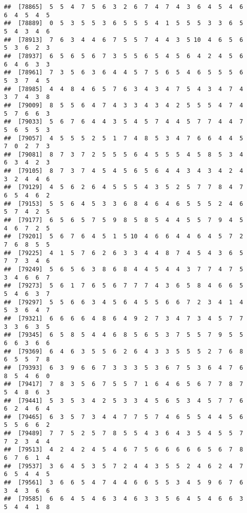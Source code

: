 \documentclass[
]{book}
\begin{document}
\begin{verbatim}
##  [78865]  5  5  4  7  5  6  3  2  6  7  4  7  4  3  6  4  5  4  6  6  4  5  4  5
##  [78889]  0  5  3  5  5  3  6  5  5  5  4  1  5  5  5  3  3  6  5  5  4  3  4  6
##  [78913]  7  6  3  4  4  6  7  5  5  7  4  4  3  5 10  4  6  5  6  5  3  6  2  3
##  [78937]  6  5  6  5  6  7  3  5  5  6  5  4  5  6  4  2  4  5  6  6  4  6  3  3
##  [78961]  7  3  5  6  3  6  4  4  5  7  5  6  5  4  6  5  5  5  6  5  3  7  4  5
##  [78985]  4  4  8  4  6  5  7  6  3  4  3  4  7  5  4  3  4  7  4  3  7  4  3  8
##  [79009]  8  5  5  6  4  7  4  3  3  4  3  4  2  5  5  5  4  7  4  5  7  6  6  3
##  [79033]  5  6  7  6  4  4  3  5  4  5  7  4  4  5  7  7  4  4  7  5  6  5  5  3
##  [79057]  4  5  5  5  2  5  1  7  4  8  5  3  4  7  6  6  4  4  5  7  0  2  7  3
##  [79081]  8  7  3  7  2  5  5  5  6  4  5  5  5  4  5  8  5  3  4  6  3  4  2  3
##  [79105]  8  7  3  7  4  5  4  5  6  5  6  4  4  3  4  3  4  2  4  3  2  4  4  6
##  [79129]  4  5  6  2  6  4  5  5  5  4  3  5  2  5  7  7  8  4  7  6  5  4  6  2
##  [79153]  5  5  6  4  5  3  3  6  8  4  6  4  6  5  5  5  2  4  6  5  7  4  2  5
##  [79177]  6  5  6  5  7  5  9  8  5  8  5  4  4  5  5  7  9  4  5  4  6  7  2  5
##  [79201]  5  6  7  6  4  5  1  5 10  4  6  6  4  4  6  4  5  7  2  7  6  8  5  5
##  [79225]  4  1  5  7  6  2  6  3  3  4  4  8  7  4  5  4  3  6  5  7  7  3  4  6
##  [79249]  5  6  5  6  3  8  6  8  4  4  5  4  4  3  7  7  4  7  5  3  4  6  6  7
##  [79273]  5  6  1  7  6  5  6  7  7  7  4  3  6  5  8  4  6  6  5  5  4  6  3  7
##  [79297]  5  5  6  6  3  4  5  6  4  5  5  6  6  7  2  3  4  1  4  5  3  6  4  7
##  [79321]  6  6  6  6  4  8  6  4  9  2  7  3  4  7  3  4  5  7  7  3  3  6  3  5
##  [79345]  6  5  8  5  4  4  6  8  5  6  5  3  7  5  5  7  9  5  5  6  6  3  6  6
##  [79369]  6  4  6  3  5  5  6  2  6  4  3  3  5  5  5  2  7  6  8  6  5  5  7  8
##  [79393]  6  3  9  6  6  7  3  3  3  5  3  6  7  5  3  6  4  7  6  8  5  4  6  0
##  [79417]  7  8  3  5  6  7  5  5  7  1  6  4  6  5  6  7  7  8  7  5  4  8  6  3
##  [79441]  5  3  5  3  4  2  5  3  3  4  5  6  5  3  4  5  7  7  6  6  2  4  6  4
##  [79465]  6  3  5  7  3  4  4  7  7  5  7  4  6  5  5  4  4  5  6  5  5  6  6  2
##  [79489]  7  7  5  2  5  7  8  5  5  4  3  6  4  3  5  4  5  5  7  7  2  3  4  4
##  [79513]  4  2  4  2  4  5  4  6  7  5  6  6  6  6  6  5  6  7  8  6  7  6  1  4
##  [79537]  3  6  4  5  3  5  7  2  4  4  3  5  5  2  4  6  2  4  7  6  5  4  4  5
##  [79561]  3  6  6  5  4  7  4  4  6  6  5  5  3  4  5  9  6  7  6  3  4  3  6  6
##  [79585]  6  6  4  5  4  6  3  4  6  3  3  5  6  4  5  4  6  6  3  5  4  4  1  8

\end{verbatim}
\end{document}
